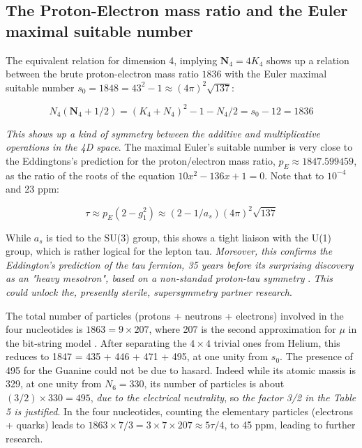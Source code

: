 \documentclass[a4paper,9pt]{article}
\begin{document}
\subsection{The Proton-Electron mass ratio and the Euler maximal suitable number} 

The equivalent relation for dimension 4, implying $\textbf{N}_4 = 4 K_4$ shows up a relation between the brute proton-electron mass ratio $1836$ with the Euler maximal suitable number $s_0 = 1848 = 43^2 -1 \approx (4\pi)^2\sqrt {137}$:

\begin{equation}\label{Eq27}
 N_4(\textbf{N}_4 + 1/2) = (K_4 + N_4)^2 - 1 - N_4/2 = s_0 - 12 = 1836
 \end{equation}

\textit{This shows up a kind of symmetry between the additive and multiplicative operations in the 4D space}. The maximal Euler's suitable number is very close to the Eddingtons's prediction \cite{Eddington} for the proton/electron mass ratio, $p_E \approx 1847.599459$, as the ratio of the roots of the equation $10x^2 - 136 x + 1 = 0$. Note that to $10^{-4}$ and 23 ppm:

\begin{equation}\label{Eq28}
 \tau \approx p_E(2-g_1^2) \approx (2-1/a_s)(4\pi)^2\sqrt {137}
 \end{equation}
 
While $a_s$ is tied to the SU(3) group, this shows a tight liaison with the U(1) group, which is rather logical for the lepton tau. \textit {Moreover, this confirms the Eddington's prediction of the tau fermion, 35 years before its surprising discovery as an "heavy mesotron", based on a non-standad proton-tau symmetry} \cite{Eddington}. \textit{This could unlock the, presently sterile, supersymmetry partner research}. 
 
The total number of particles (protons + neutrons + electrons) involved in the four nucleotides is $1863 = 9\times 207$, where 207 is the second approximation for $\mu$ in the bit-string model \cite{Noyes}. After separating the $4\times4$ trivial ones from Helium, this reduces to 1847 = 435 + 446 + 471 + 495, at one unity from $s_0$. The presence of 495 for the Guanine could not be due to hasard. Indeed while its atomic massis is 329, at one unity from $N_6 = 330$, its number of particles is about $(3/2) \times 330 = 495$, \textit {due to the electrical neutrality}, so \textit {the factor 3/2 in the Table 5 is justified}. In the four nucleotides, counting the elementary particles (electrons + quarks) leads to $1863 \times 7/3 = 3 \times 7 \times 207 \approx 5\tau/4$, to 45 ppm, leading to further research.
\end{document}
